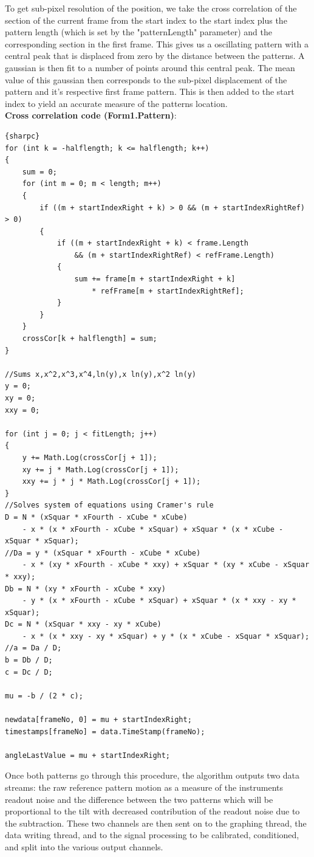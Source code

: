 \documentclass{article}
\begin{document}
To get sub-pixel resolution of the position, we take the cross correlation of the section of the current frame from the start index to the start index plus the pattern length (which is set by the "patternLength" parameter) and the corresponding section in the first frame. This gives us a oscillating pattern with a central peak that is displaced from zero by the distance between the patterns. A gaussian is then fit to a number of points around this central peak. The mean value of this gaussian then corresponds to the sub-pixel displacement of the pattern and it's respective first frame pattern. This is then added to the start index to yield an accurate measure of the patterns location.\\

\textbf{Cross correlation code (Form1.Pattern)}:
\begin{lstlisting}{sharpc}    
for (int k = -halflength; k <= halflength; k++)
{
	sum = 0;
	for (int m = 0; m < length; m++)
	{
		if ((m + startIndexRight + k) > 0 && (m + startIndexRightRef) > 0)
		{
			if ((m + startIndexRight + k) < frame.Length 
				&& (m + startIndexRightRef) < refFrame.Length)
			{
				sum += frame[m + startIndexRight + k] 
					* refFrame[m + startIndexRightRef];
			}
		}
	}
	crossCor[k + halflength] = sum;
}

//Sums x,x^2,x^3,x^4,ln(y),x ln(y),x^2 ln(y)
y = 0;
xy = 0;
xxy = 0;

for (int j = 0; j < fitLength; j++)
{
	y += Math.Log(crossCor[j + 1]);
	xy += j * Math.Log(crossCor[j + 1]);
	xxy += j * j * Math.Log(crossCor[j + 1]);
}
//Solves system of equations using Cramer's rule
D = N * (xSquar * xFourth - xCube * xCube) 
	- x * (x * xFourth - xCube * xSquar) + xSquar * (x * xCube - xSquar * xSquar);
//Da = y * (xSquar * xFourth - xCube * xCube) 
	- x * (xy * xFourth - xCube * xxy) + xSquar * (xy * xCube - xSquar * xxy);
Db = N * (xy * xFourth - xCube * xxy) 
	- y * (x * xFourth - xCube * xSquar) + xSquar * (x * xxy - xy * xSquar);
Dc = N * (xSquar * xxy - xy * xCube) 
	- x * (x * xxy - xy * xSquar) + y * (x * xCube - xSquar * xSquar);
//a = Da / D;
b = Db / D;
c = Dc / D;

mu = -b / (2 * c);

newdata[frameNo, 0] = mu + startIndexRight;
timestamps[frameNo] = data.TimeStamp(frameNo);

angleLastValue = mu + startIndexRight;

\end{lstlisting}

Once both patterns go through this procedure, the algorithm outputs two data streams: the raw reference pattern motion as a measure of the instruments readout noise and the difference between the two patterns which will be proportional to the tilt with decreased contribution of the readout noise due to the subtraction. These two channels are then sent on to the graphing thread, the data writing thread, and to the signal processing to be calibrated, conditioned, and split into the various output channels.
\end{document}
